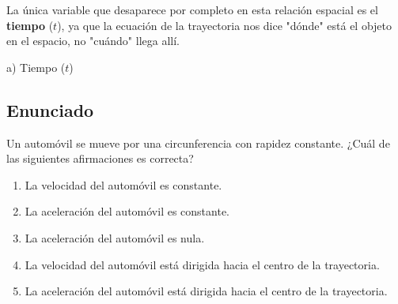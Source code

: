 \documentclass[12pt, a4paper]{article}
\begin{document}
La única variable que desaparece por completo en esta relación espacial es el \textbf{tiempo} ($t$), ya que la ecuación de la trayectoria nos dice "dónde" está el objeto en el espacio, no "cuándo" llega allí.

\begin{tcolorbox}[colback=green!5!white, colframe=green!50!black, title=Respuesta Final]
\centering \Large a) Tiempo ($t$)
\end{tcolorbox}

\newpage

\subsection*{Enunciado}
Un automóvil se mueve por una circunferencia con rapidez constante. ¿Cuál de las siguientes afirmaciones es correcta?

\begin{enumerate}[label=\alph*)]
    \item La velocidad del automóvil es constante.
    \item La aceleración del automóvil es constante.
    \item La aceleración del automóvil es nula.
    \item La velocidad del automóvil está dirigida hacia el centro de la trayectoria.
    \item La aceleración del automóvil está dirigida hacia el centro de la trayectoria.
\end{enumerate}

\begin{center}
\end{center}
\end{document}
